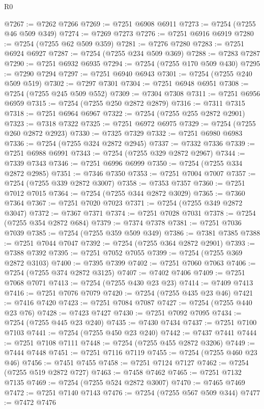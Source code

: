 \begin{lexlean}{R0}
\begin{coremodule}
@7267 := @7262 @7266
@7269 := @7251 @6908 @6911
@7273 := @7254 (@7255 @46 @509 @349)
@7274 := @7269 @7273
@7276 := @7251 @6916 @6919
@7280 := @7254 (@7255 @62 @509 @359)
@7281 := @7276 @7280
@7283 := @7251 @6924 @6927
@7287 := @7254 (@7255 @234 @509 @369)
@7288 := @7283 @7287
@7290 := @7251 @6932 @6935
@7294 := @7254 (@7255 @170 @509 @430)
@7295 := @7290 @7294
@7297 := @7251 @6940 @6943
@7301 := @7254 (@7255 @240 @509 @519)
@7302 := @7297 @7301
@7304 := @7251 @6948 @6951
@7308 := @7254 (@7255 @245 @509 @552)
@7309 := @7304 @7308
@7311 := @7251 @6956 @6959
@7315 := @7254 (@7255 @250 @2872 @2879)
@7316 := @7311 @7315
@7318 := @7251 @6964 @6967
@7322 := @7254 (@7255 @255 @2872 @2901)
@7323 := @7318 @7322
@7325 := @7251 @6972 @6975
@7329 := @7254 (@7255 @260 @2872 @2923)
@7330 := @7325 @7329
@7332 := @7251 @6980 @6983
@7336 := @7254 (@7255 @324 @2872 @2945)
@7337 := @7332 @7336
@7339 := @7251 @6988 @6991
@7343 := @7254 (@7255 @329 @2872 @2967)
@7344 := @7339 @7343
@7346 := @7251 @6996 @6999
@7350 := @7254 (@7255 @334 @2872 @2985)
@7351 := @7346 @7350
@7353 := @7251 @7004 @7007
@7357 := @7254 (@7255 @339 @2872 @3007)
@7358 := @7353 @7357
@7360 := @7251 @7012 @7015
@7364 := @7254 (@7255 @344 @2872 @3029)
@7365 := @7360 @7364
@7367 := @7251 @7020 @7023
@7371 := @7254 (@7255 @349 @2872 @3047)
@7372 := @7367 @7371
@7374 := @7251 @7028 @7031
@7378 := @7254 (@7255 @354 @2872 @684)
@7379 := @7374 @7378
@7381 := @7251 @7036 @7039
@7385 := @7254 (@7255 @359 @509 @349)
@7386 := @7381 @7385
@7388 := @7251 @7044 @7047
@7392 := @7254 (@7255 @364 @2872 @2901)
@7393 := @7388 @7392
@7395 := @7251 @7052 @7055
@7399 := @7254 (@7255 @369 @2872 @3103)
@7400 := @7395 @7399
@7402 := @7251 @7060 @7063
@7406 := @7254 (@7255 @374 @2872 @3125)
@7407 := @7402 @7406
@7409 := @7251 @7068 @7071
@7413 := @7254 (@7255 @430 @23 @23)
@7414 := @7409 @7413
@7416 := @7251 @7076 @7079
@7420 := @7254 (@7255 @435 @23 @46)
@7421 := @7416 @7420
@7423 := @7251 @7084 @7087
@7427 := @7254 (@7255 @440 @23 @76)
@7428 := @7423 @7427
@7430 := @7251 @7092 @7095
@7434 := @7254 (@7255 @445 @23 @240)
@7435 := @7430 @7434
@7437 := @7251 @7100 @7103
@7441 := @7254 (@7255 @450 @23 @240)
@7442 := @7437 @7441
@7444 := @7251 @7108 @7111
@7448 := @7254 (@7255 @455 @2872 @3206)
@7449 := @7444 @7448
@7451 := @7251 @7116 @7119
@7455 := @7254 (@7255 @460 @23 @46)
@7456 := @7451 @7455
@7458 := @7251 @7124 @7127
@7462 := @7254 (@7255 @519 @2872 @727)
@7463 := @7458 @7462
@7465 := @7251 @7132 @7135
@7469 := @7254 (@7255 @524 @2872 @3007)
@7470 := @7465 @7469
@7472 := @7251 @7140 @7143
@7476 := @7254 (@7255 @567 @509 @344)
@7477 := @7472 @7476

\end{coremodule}
\end{lexlean}
